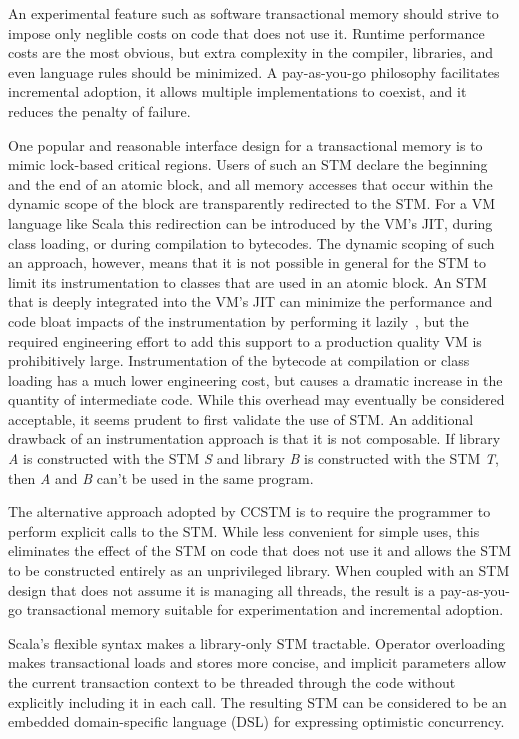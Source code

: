 
An experimental feature such as software transactional memory should
strive to impose only neglible costs on code that does not use it.
Runtime performance costs are the most obvious, but extra complexity in
the compiler, libraries, and even language rules should be minimized.
A pay-as-you-go philosophy facilitates incremental adoption, it allows
multiple implementations to coexist, and it reduces the penalty of
failure.

One popular and reasonable interface design for a transactional memory
is to mimic lock-based critical regions.  Users of such an STM declare
the beginning and the end of an atomic block, and all memory accesses
that occur within the dynamic scope of the block are transparently
redirected to the STM.  For a VM language like Scala this redirection
can be introduced by the VM's JIT, during class loading, or during
compilation to bytecodes.  The dynamic scoping of such an approach,
however, means that it is not possible in general for the STM to
limit its instrumentation to classes that are used in an atomic block.
An STM that is deeply integrated into the VM's JIT can minimize the
performance and code bloat impacts of the instrumentation by performing it
lazily~\cite{??}, but the required engineering effort to add this support
to a production quality VM is prohibitively large.  Instrumentation of
the bytecode at compilation or class loading has a much lower engineering
cost, but causes a dramatic increase in the quantity of intermediate code.
While this overhead may eventually be considered acceptable, it seems
prudent to first validate the use of STM.  An additional drawback of
an instrumentation approach is that it is not composable.  If library
\textit{A} is constructed with the STM \textit{S} and library \textit{B}
is constructed with the STM \textit{T}, then \textit{A} and \textit{B}
can't be used in the same program.

The alternative approach adopted by CCSTM is to require the programmer to perform
explicit calls to the STM.  While less convenient for simple uses, this
eliminates the effect of the STM on code that does not use it and
allows the STM to be constructed entirely as an unprivileged library.
When coupled with an STM design that does not assume it is managing all
threads, the result is a pay-as-you-go transactional memory suitable
for experimentation and incremental adoption.

Scala's flexible syntax makes a library-only STM tractable.  Operator
overloading makes transactional loads and stores more concise,
and implicit parameters allow the current transaction context to be
threaded through the code without explicitly including it in each call.
The resulting STM can be considered to be an embedded domain-specific
language (DSL) for expressing optimistic concurrency.



